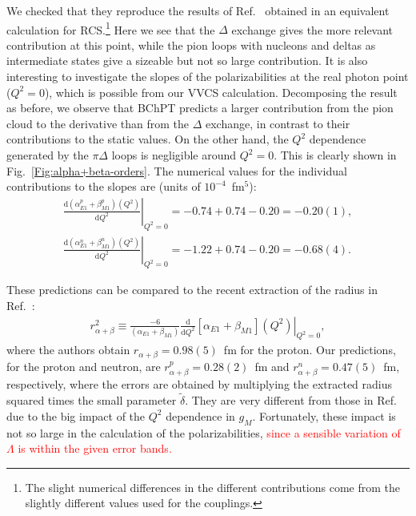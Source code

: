 \documentclass[twocolumn,prc,showpacs,nofootinbib,preprintnumbers,amsmath,amssymb,superscriptaddress]{revtex4-1}
\def\dd{\mathrm{d}}
\begin{document}
We checked that they reproduce the results of Ref.~\cite{Lensky:2009uv} obtained in an equivalent calculation for RCS.\footnote{The slight numerical differences in the different contributions come from the slightly different values used for the couplings.} 
Here we see that the $\Delta$ exchange gives the more relevant contribution at this point, while the pion loops with nucleons and deltas as intermediate states give a sizeable but not so large contribution. 
It is also interesting to investigate the slopes of the polarizabilities at the real photon point ($Q^2=0$), which is possible from our VVCS calculation. 
Decomposing the result as before, we observe that BChPT predicts a larger contribution from the pion cloud to the derivative than from the $\Delta$ exchange, in contrast to their contributions to the static values. 
On the other hand, the $Q^2$ dependence generated by the $\pi \Delta$ loops is negligible around $Q^2=0$. 
This is clearly shown in Fig.~\ref{Fig:alpha+beta-orders}. The numerical values for the individual contributions to the slopes are (units of   $10^{-4}$~fm$^5$):
\begin{align}
\left.\frac{\dd(\alpha_{E1}^p + \beta_{M1}^p) (Q^2)}{\dd Q^2}\right|_{Q^2=0}= -0.74  + 0.74-0.20 = -0.20(1),\\
\left.\frac{\dd(\alpha_{E1}^n + \beta_{M1}^n) (Q^2)}{\dd Q^2}\right|_{Q^2=0}= -1.22  +0.74-0.20 =-0.68(4).
\end{align}


These predictions can be compared to the recent extraction of the radius in Ref.~\cite{Hall:2014lea}: 
\begin{align}\label{Eq:r2alphabetaDef}
r_{\alpha+\beta}^2\equiv \frac{-6}{(\alpha_{E1}+\beta_{M1})}\left.\frac{\dd}{\dd Q^2}[\alpha_{E1}+\beta_{M1}](Q^2)\right|_{Q^2=0},
\end{align}
where the authors obtain $r_{\alpha+\beta}=0.98(5)$~fm for the proton. 
Our predictions, for the proton and neutron,  are $r^p_{\alpha+\beta}= 0.28(2)$~fm and $r^n_{\alpha+\beta}=0.47(5)$~fm, respectively, where the errors are obtained by multiplying the extracted radius squared times the small parameter $\tilde{\delta}$. 
They are very different from those in Ref.\cite{Hall:2014lea} due to the big impact of the $Q^2$ dependence in $g_M$.
Fortunately, these impact is not so large in the calculation of the polarizabilities, \textcolor{red}{since a sensible variation of $\Lambda$ is within the given error bands.}
\end{document}
